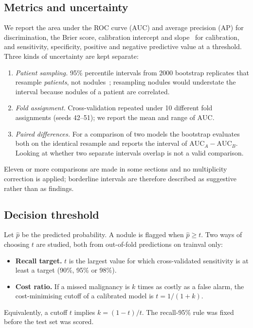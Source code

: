 \documentclass[journal]{IEEEtran}
\newcommand{\auc}{\mathrm{AUC}}
\begin{document}
\subsection{Metrics and uncertainty}
We report the area under the ROC curve ($\auc$) and average precision (AP) for discrimination, the Brier
score, calibration intercept and slope~\cite{steyerberg2010assessing} for calibration, and sensitivity,
specificity, positive and negative predictive value at a threshold. Three kinds of uncertainty are kept separate:
\begin{enumerate}
  \item \emph{Patient sampling.} 95\% percentile intervals from 2000 bootstrap replicates that resample
        \emph{patients}, not nodules~\cite{efron1993bootstrap}; resampling nodules would understate the
        interval because nodules of a patient are correlated.
  \item \emph{Fold assignment.} Cross-validation repeated under 10 different fold assignments (seeds 42--51);
        we report the mean and range of $\auc$.
  \item \emph{Paired differences.} For a comparison of two models the bootstrap evaluates both on the
        identical resample and reports the interval of $\auc_A-\auc_B$. Looking at whether two separate
        intervals overlap is not a valid comparison.
\end{enumerate}
Eleven or more comparisons are made in some sections and no multiplicity correction is applied; borderline
intervals are therefore described as suggestive rather than as findings.

\subsection{Decision threshold}
Let $\hat p$ be the predicted probability. A nodule is flagged when $\hat p\geq t$. Two ways of choosing $t$
are studied, both from out-of-fold predictions on trainval only:
\begin{itemize}
  \item \textbf{Recall target.} $t$ is the largest value for which cross-validated sensitivity is at least a target
        (90\%, 95\% or 98\%).
  \item \textbf{Cost ratio.} If a missed malignancy is $k$ times as costly as a false alarm, the cost-minimising
        cutoff of a calibrated model is $t=1/(1+k)$.
\end{itemize}
Equivalently, a cutoff $t$ implies $k=(1-t)/t$. The recall-95\% rule was fixed before the test set was scored.
\end{document}
